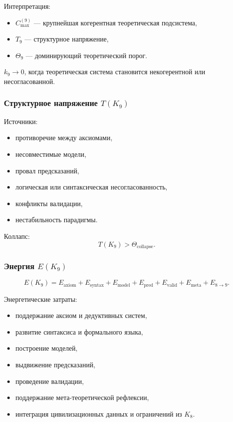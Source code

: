Интерпретация:
\begin{itemize}
    \item $C_{\max}^{(9)}$ — крупнейшая когерентная теоретическая подсистема,
    \item $T_9$ — структурное напряжение,
    \item $\Theta_9$ — доминирующий теоретический порог.
\end{itemize}

$k_9 \to 0$, когда теоретическая система становится некогерентной или несогласованной.

\subsubsection{Структурное напряжение \texorpdfstring{$T(K_9)$}{T(K_9)}}

Источники:
\begin{itemize}
    \item противоречие между аксиомами,
    \item несовместимые модели,
    \item провал предсказаний,
    \item логическая или синтаксическая несогласованность,
    \item конфликты валидации,
    \item нестабильность парадигмы.
\end{itemize}

Коллапс:
\[
T(K_9) > \Theta_{\mathrm{collapse}}.
\]

\subsubsection{Энергия \texorpdfstring{$E(K_9)$}{E(K_9)}}

\[
E(K_9)=
E_{\mathrm{axiom}}+
E_{\mathrm{syntax}}+
E_{\mathrm{model}}+
E_{\mathrm{pred}}+
E_{\mathrm{valid}}+
E_{\mathrm{meta}}+
E_{8\to9}.
\]

Энергетические затраты:
\begin{itemize}
    \item поддержание аксиом и дедуктивных систем,
    \item развитие синтаксиса и формального языка,
    \item построение моделей,
    \item выдвижение предсказаний,
    \item проведение валидации,
    \item поддержание мета-теоретической рефлексии,
    \item интеграция цивилизационных данных и ограничений из $K_8$.
\end{itemize}

